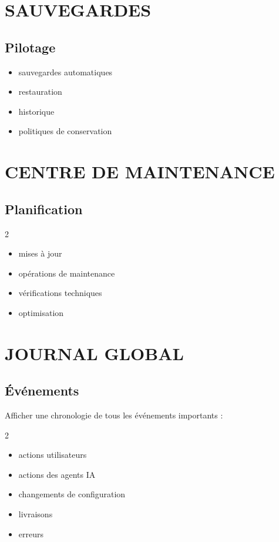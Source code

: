 \documentclass[12pt,a4paper,oneside]{book}
\begin{document}
\chapter{SAUVEGARDES}

\section{Pilotage}
\begin{itemize}
\item sauvegardes automatiques
\item restauration
\item historique
\item politiques de conservation
\end{itemize}

\chapter{CENTRE DE MAINTENANCE}

\section{Planification}
\begin{multicols}{2}
\begin{itemize}
\item mises à jour
\item opérations de maintenance
\item vérifications techniques
\item optimisation
\end{itemize}
\end{multicols}

\chapter{JOURNAL GLOBAL}

\section{Événements}
Afficher une chronologie de tous les événements importants :
\begin{multicols}{2}
\begin{itemize}
\item actions utilisateurs
\item actions des agents IA
\item changements de configuration
\item livraisons
\item erreurs
\end{itemize}
\end{multicols}
\end{document}
